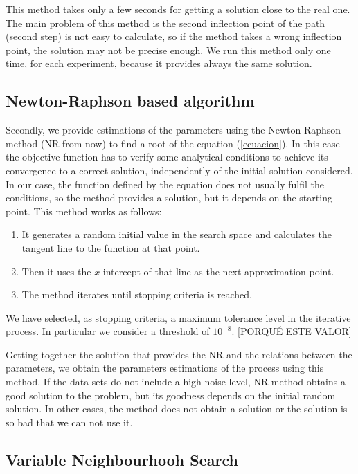 \documentclass{sig-alternate}
\begin{document}
This method takes only a few seconds for getting a solution close to the real one. The main problem of this method is the second inflection point of the path (second step) is not easy to calculate, so if the method takes a wrong inflection point, the solution may not be precise enough. We run this method only one time, for each experiment, because it provides always the same solution.

\subsection{Newton-Raphson based algorithm}
\label{subsec:NRS}

Secondly, we provide estimations of the parameters using the Newton-Raphson method (NR from now) to find a root of the equation (\ref{ecuacion}). In this case the objective function has to verify some analytical conditions to achieve its convergence to a correct solution, independently of the initial solution considered. In our case, the function defined by the equation does not usually fulfil the conditions, so the method provides a solution, but it depends on the starting point. This method works as follows:


\begin{enumerate}
\item It generates a random initial value in the search space and calculates the tangent line to the function at that point.
\item Then it uses the $x$-intercept of that line as the next approximation point.
\item The method iterates until stopping criteria is reached.
\end{enumerate}

We have selected, as stopping criteria, a maximum tolerance level in the iterative process. In particular we consider a threshold of $10^{-8}$. [PORQUÉ ESTE VALOR]

Getting together the solution that provides the NR and the relations between the parameters, we obtain the parameters estimations of the process using this method. If the data sets do not include a high noise level, NR method obtains a good solution to the problem, but its goodness depends on the initial random solution. In other cases, the method does not obtain a solution or the solution is so bad that we can not use it.



\subsection{Variable Neighbourhooh Search}
\end{document}
